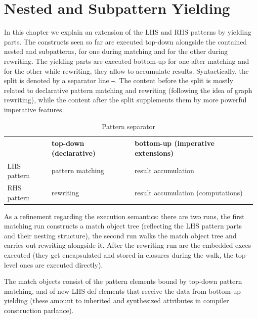 \chapter{Nested and Subpattern Yielding}%
\label{cha:yielding}

In this chapter we explain an extension of the LHS and RHS patterns by yielding parts.
The constructs seen so far are executed top-down alongside the contained nested and subpatterns, for one during matching and for the other during rewriting.
The yielding parts are executed bottom-up for one after matching and for the other while rewriting, they allow to accumulate results.
Syntactically, the split is denoted by a separator line \texttt{---}.
The content before the split is mostly related to declarative pattern matching and rewriting (following the idea of graph rewriting), while the content after the split supplements them by more powerful imperative features.

\begin{table}[htbp]
  \centering
  \begin{tabularx}{\linewidth}{|l|X|X|} 
		\hline
     & top-down (declarative) & bottom-up (imperative extensions) \\
		\hline
    LHS pattern & pattern matching & result accumulation \\
		\hline
    RHS pattern & rewriting & result accumulation (computations) \\
		\hline
  \end{tabularx}
  \caption{Pattern separator}
  \label{patternsepar}
\end{table}

As a refinement regarding the execution semantics:
there are two runs, the first matching run constructs a match object tree (reflecting the LHS pattern parts and their nesting structure),
the second run walks the match object tree and carries out rewriting alongside it.
After the rewriting run are the embedded execs executed (they get encapsulated and stored in closures during the walk, the top-level ones are executed directly).

The match objects consist of the pattern elements bound by top-down pattern matching,
and of new LHS def elements that receive the data from bottom-up yielding
(these amount to inherited and synthesized attributes in compiler construction parlance).

